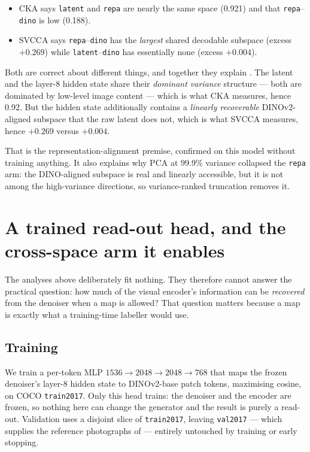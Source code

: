 \documentclass[10pt]{article}
\newcommand{\obs}[1]{\textcolor{observedblue}{#1}}
\begin{document}
\begin{itemize}
  \item CKA says \texttt{latent} and \texttt{repa} are nearly the same space (\obs{0.921}) and that
    \texttt{repa}--\texttt{dino} is low (\obs{0.188}).
  \item SVCCA says \texttt{repa}--\texttt{dino} has the \emph{largest} shared decodable subspace
    (excess \obs{$+0.269$}) while \texttt{latent}--\texttt{dino} has essentially none
    (excess \obs{$+0.004$}).
\end{itemize}

Both are correct about different things, and together they explain . The latent and
the layer-8 hidden state share their \emph{dominant variance} structure --- both are dominated by
low-level image content --- which is what CKA measures, hence \obs{0.92}. But the hidden state
additionally contains a \emph{linearly recoverable} DINOv2-aligned subspace that the raw latent does
not, which is what SVCCA measures, hence \obs{$+0.269$} versus \obs{$+0.004$}.

That is the representation-alignment premise, confirmed on this model without training anything. It
also explains why PCA at 99.9\% variance collapsed the \texttt{repa} arm: the DINO-aligned subspace
is real and linearly accessible, but it is not among the high-variance directions, so
variance-ranked truncation removes it.

\section{A trained read-out head, and the cross-space arm it enables}
\label{sec:projector}

The analyses above deliberately fit nothing. They therefore cannot answer the practical question:
how much of the visual encoder's information can be \emph{recovered} from the denoiser when a map is
allowed? That question matters because a map is exactly what a training-time labeller would use.

\subsection{Training}

We train a per-token MLP $1536 \rightarrow 2048 \rightarrow 2048 \rightarrow 768$ that maps the
frozen denoiser's layer-8 hidden state to DINOv2-base patch tokens, maximising cosine, on COCO
\texttt{train2017}. Only this head trains: the denoiser and the encoder are frozen, so nothing here
can change the generator and the result is purely a read-out. Validation uses a disjoint slice of
\texttt{train2017}, leaving \texttt{val2017} --- which supplies the reference photographs of
 --- entirely untouched by training or early stopping.
\end{document}
